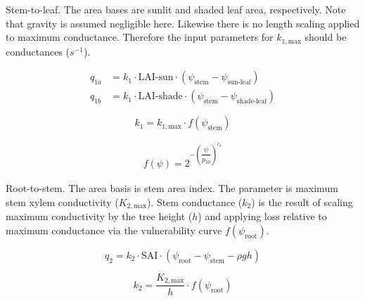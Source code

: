 \documentclass[draft,linenumbers]{agujournal}
\begin{document}
Stem-to-leaf. The area bases are sunlit and shaded leaf area, respectively. 
Note that gravity is assumed negligible here. 
Likewise there is no length scaling applied to maximum conductance. 
Therefore the input parameters for $k_{1,\text{max}}$ should be conductances ($s^{-1}$).

\begin{linenomath*} \begin{equation} \begin{aligned}
q_{1a} &= k_{1} \cdot \text{LAI-sun}  \cdot \left( \psi_{\text{stem}}-\psi_{\text{sun-leaf}}\right) \\
q_{1b} &= k_{1} \cdot \text{LAI-shade} \cdot  \left( \psi_{\text{stem}}-\psi_{\text{shade-leaf}}\right)
\end{aligned} \end{equation} \end{linenomath*}

\begin{linenomath*} \begin{equation}
k_{1} = k_{1,\text{max}} \cdot f\left(\psi_{\text{stem}}\right)
\end{equation} \end{linenomath*}

\begin{linenomath*} \begin{equation} \begin{aligned}
f\left(\psi\right)=2^{-\left(\dfrac{\psi}{p_{50}}\right)^{c_k}}
\end{aligned} \end{equation} \end{linenomath*}

Root-to-stem. The area basis is stem area index. 
The parameter is maximum stem xylem conductivity ($K_{2,\text{max}}$).
Stem conductance ($k_2$) is the result of scaling maximum conductivity by the tree height ($h$)
and applying loss relative to maximum conductance via the vulnerability curve $f\left(\psi_{\text{root}}\right)$. 
\begin{linenomath*} \begin{equation}
q_2 = k_2 \cdot  \text{SAI}  \cdot \left( \psi_{\text{root}}-\psi_{\text{stem}}-\rho g h\right)
\end{equation} \end{linenomath*}
\begin{linenomath*} \begin{equation}
k_2 = \dfrac{K_{2,\text{max}}}{h} \cdot f\left(\psi_{\text{root}}\right)
\end{equation} \end{linenomath*}
\end{document}
